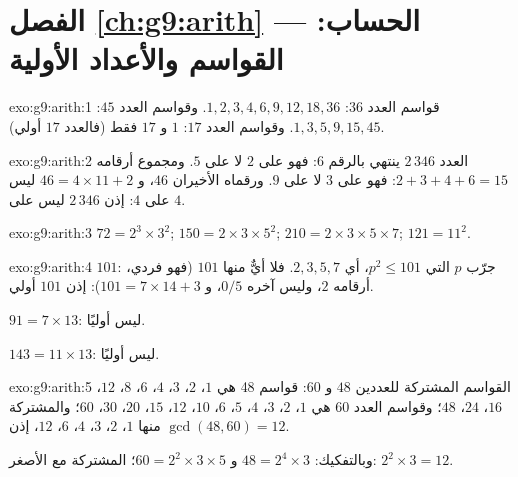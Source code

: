 \section*{الفصل \ref{ch:g9:arith} --- الحساب: القواسم والأعداد الأولية}

\begin{solution}{exo:g9:arith:1}
قواسم العدد $36$: $1, 2, 3, 4, 6, 9, 12, 18, 36$.
وقواسم العدد $45$: $1, 3, 5, 9, 15, 45$.
وقواسم العدد $17$: $1$ و $17$ فقط (فالعدد $17$ أولي).
\end{solution}

\begin{solution}{exo:g9:arith:2}
العدد $2\,346$ ينتهي بالرقم $6$: فهو  على $2$ لا على
$5$. ومجموع أرقامه $2 + 3 + 4 + 6 = 15$: فهو  على $3$
لا على $9$. ورقماه الأخيران $46$، و $46 = 4 \times 11 + 2$ ليس
 على $4$: إذن $2\,346$ ليس  على $4$.
\end{solution}

\begin{solution}{exo:g9:arith:3}
$72 = 2^3 \times 3^2$; \quad
$150 = 2 \times 3 \times 5^2$; \quad
$210 = 2 \times 3 \times 5 \times 7$; \quad
$121 = 11^2$.
\end{solution}

\begin{solution}{exo:g9:arith:4}
$101$: جرّب  $p$ التي $p^2 \leq 101$، أي
$2, 3, 5, 7$. فلا  أيٌّ منها $101$ (فهو فردي، 
أرقامه $2$، وليس آخره $0/5$، و $101 = 7 \times 14 + 3$): إذن $101$
أولي.

$91 = 7 \times 13$: ليس أوليًا.

$143 = 11 \times 13$: ليس أوليًا.
\end{solution}

\begin{solution}{exo:g9:arith:5}
القواسم المشتركة للعددين $48$ و $60$: قواسم 48 هي
$1$، $2$، $3$، $4$، $6$، $8$، $12$، $16$، $24$، $48$؛ وقواسم العدد
$60$ هي $1$، $2$، $3$، $4$، $5$، $6$، $10$، $12$، $15$، $20$، $30$،
$60$؛ والمشتركة منها $1$، $2$، $3$، $4$، $6$، $12$، إذن
$\gcd(48,60) = 12$.

وبالتفكيك: $48 = 2^4 \times 3$ و $60 = 2^2 \times 3 \times 5$؛
 المشتركة مع  الأصغر: $2^2 \times 3 = 12$.
\end{solution}


